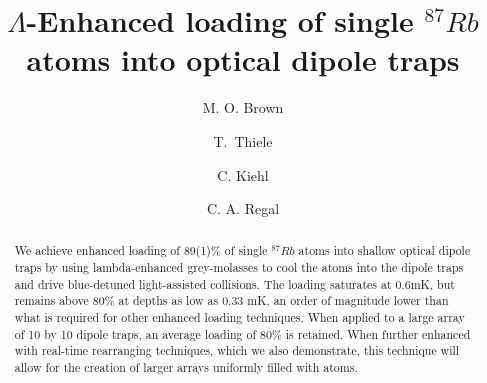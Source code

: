 \documentclass[aps,prl,amsmath,amssymb,groupedaddress,10pt,superscriptaddress,floatfix,twocolumn,showkeys,longbibliography]{revtex4-1} %
\begin{document}
\title{$\Lambda$-Enhanced loading of single $^{87} Rb$ atoms into optical dipole traps }

\author{M. O. Brown}  
\author{T.~Thiele}
\author{C. Kiehl}
\author{C. A. Regal} 

\pacs{}

\renewcommand{\i}{{\mathrm i}} \def\1{\mathchoice{\rm 1\mskip-4.2mu l}{\rm 1\mskip-4.2mu l}{\rm
1\mskip-4.6mu l}{\rm 1\mskip-5.2mu l}} \newcommand{\ket}[1]{|#1\rangle} \newcommand{\tybra}[1]{\langle
#1|} \newcommand{\braket}[2]{\langle #1|#2\rangle} \newcommand{\kebtra}[2]{|#1\rangle\langle#2|}
\newcommand{\opelem}[3]{\langle #1|#2|#3\rangle} \newcommand{\projection}[1]{|#1\rangle\langle#1|}
\newcommand{\scalar}[1]{\langle #1|#1\rangle} \newcommand{\op}[1]{\hat{#1}}
\newcommand{\vect}[1]{\boldsymbol{#1}} \newcommand{\id}{\text{id}}

\begin{abstract}
We achieve enhanced loading of 89(1)\% of single $^{87} Rb$ atoms into shallow optical dipole traps by using lambda-enhanced grey-molasses to cool the atoms into the dipole traps and drive blue-detuned light-assisted collisions. The loading saturates at 0.6mK, but remains above 80\% at depths as low as 0.33 mK, an order of magnitude lower than what is required for other enhanced loading techniques. When applied to a large array of 10 by 10 dipole traps, an average loading of 80\% is retained. When further enhanced with real-time rearranging techniques, which we also demonstrate, this technique will allow for the creation of larger arrays uniformly filled with atoms.
\end{abstract}
\maketitle
\end{document}
